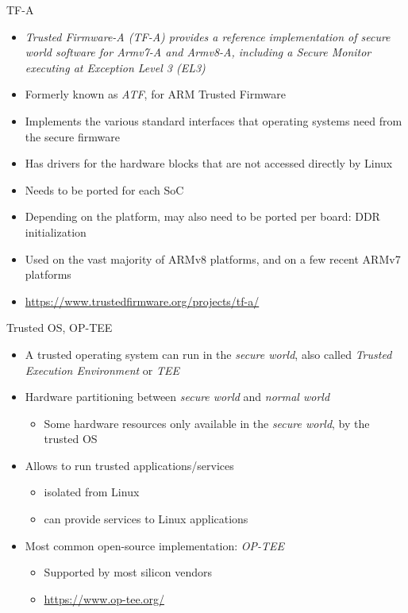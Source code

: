 \begin{frame}{TF-A}
  \begin{itemize}
  \item {\em Trusted Firmware-A (TF-A) provides a reference
      implementation of secure world software for Armv7-A and Armv8-A,
      including a Secure Monitor executing at Exception Level 3 (EL3)}
  \item Formerly known as {\em ATF}, for ARM Trusted Firmware
  \item Implements the various standard interfaces that operating
    systems need from the secure firmware
  \item Has drivers for the hardware blocks that are not accessed
    directly by Linux
  \item Needs to be ported for each SoC
  \item Depending on the platform, may also need to be ported per
    board: DDR initialization
  \item Used on the vast majority of ARMv8 platforms, and on a few
    recent ARMv7 platforms
  \item \url{https://www.trustedfirmware.org/projects/tf-a/}
  \end{itemize}
\end{frame}

\begin{frame}{Trusted OS, OP-TEE}
  \begin{itemize}
  \item A trusted operating system can run in the {\em secure world},
    also called {\em Trusted Execution Environment} or {\em TEE}
  \item Hardware partitioning between {\em secure world} and {\em
      normal world}
    \begin{itemize}
    \item Some hardware resources only available in the {\em secure
        world}, by the trusted OS
    \end{itemize}
  \item Allows to run trusted applications/services
    \begin{itemize}
    \item isolated from Linux
    \item can provide services to Linux applications
    \end{itemize}
  \item Most common open-source implementation: {\em OP-TEE}
    \begin{itemize}
    \item Supported by most silicon vendors
    \item \url{https://www.op-tee.org/}
    \end{itemize}
  \end{itemize}
\end{frame}


